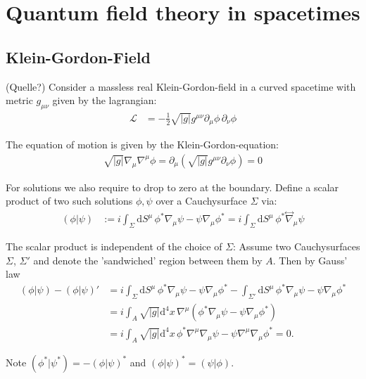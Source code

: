 \chapter{Quantum field theory in spacetimes}
\section{Klein-Gordon-Field}
(Quelle?)
Consider a massless real Klein-Gordon-field in a curved spacetime with metric \(g_{\mu\nu}\) given by the lagrangian:
\begin{align}
\mathcal{L} &= -\frac{1}{2}\sqrt{|g|} g^{\mu\nu} \partial_\mu \phi\,\partial_\nu \phi 
\end{align}

The equation of motion is given by the Klein-Gordon-equation:
\begin{align}
\sqrt{|g|}\nabla_\mu\nabla^\mu \phi = \partial_\mu \left(\sqrt{|g|} g^{\mu\nu} \partial_\nu \phi\right) = 0
\end{align}

For solutions we also require to drop to zero at the boundary. Define a scalar product of two such solutions $\phi, \psi$ over a Cauchysurface \(\Sigma\) via:
\begin{align}
(\phi|\psi) &:= i \int_{\Sigma} \mathrm{d}S^\mu\, \phi^*\nabla_\mu \psi - \psi\nabla_\mu \phi^* = i \int_{\Sigma} \mathrm{d}S^\mu\, \phi^*\overset{\leftrightarrow}{\nabla}_\mu \psi
\end{align}

The scalar product is independent of the choice of \(\Sigma\)\cite{Townsend}: Assume two Cauchysurfaces \(\Sigma\), \(\Sigma'\) and denote the 'sandwiched' region between them by \(A\). Then by Gauss' law
\begin{align}
(\phi|\psi) - (\phi|\psi)' &= i\int_{\Sigma}\mathrm{d}S^\mu\, \phi^*\nabla_\mu \psi - \psi\nabla_\mu \phi^* - \int_{\Sigma'}\mathrm{d}S^\mu\, \phi^*\nabla_\mu \psi - \psi\nabla_\mu \phi^*\\
	&= i\int_{A} \sqrt{|g|} \mathrm{d^4}x\,\nabla^\mu \left(\phi^*\nabla_\mu \psi - \psi\nabla_\mu \phi^*\right)\\
	&= i\int_{A} \sqrt{|g|} \mathrm{d^4}x\,\phi^*\nabla^\mu\nabla_\mu \psi - \psi \nabla^\mu\nabla_\mu\phi^* = 0.
\label{equ:qft_scalarproduct_invariant}
\end{align}

Note \((\phi^*|\psi^*) = -(\phi|\psi)^*\) and \((\phi|\psi)^* = (\psi|\phi)\).\\

